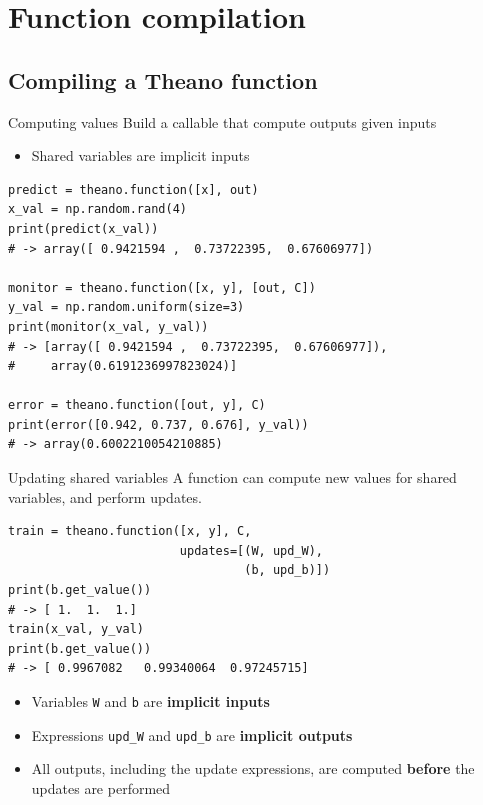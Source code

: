 \documentclass[a4paper,9pt]{beamer}
\begin{document}
\section{Function compilation}
\begin{frame}
  \tableofcontents[currentsection]
\end{frame}

\subsection{Compiling a Theano function}

\begin{frame}[fragile]{Computing values}
  Build a callable that compute outputs given inputs
  \begin{itemize}
    \item Shared variables are implicit inputs
  \end{itemize}
  \begin{verbatim}
predict = theano.function([x], out)
x_val = np.random.rand(4)
print(predict(x_val))
# -> array([ 0.9421594 ,  0.73722395,  0.67606977])

monitor = theano.function([x, y], [out, C])
y_val = np.random.uniform(size=3)
print(monitor(x_val, y_val))
# -> [array([ 0.9421594 ,  0.73722395,  0.67606977]),
#     array(0.6191236997823024)]

error = theano.function([out, y], C)
print(error([0.942, 0.737, 0.676], y_val))
# -> array(0.6002210054210885)
  \end{verbatim}
\end{frame}


\begin{frame}[fragile]{Updating shared variables}
  A function can compute new values for shared variables, and perform updates.
  \begin{verbatim}
train = theano.function([x, y], C,
                        updates=[(W, upd_W),
                                 (b, upd_b)])
print(b.get_value())
# -> [ 1.  1.  1.]
train(x_val, y_val)
print(b.get_value())
# -> [ 0.9967082   0.99340064  0.97245715]
  \end{verbatim}
  \begin{itemize}
    \item Variables \verb|W| and \verb|b| are {\bf implicit inputs}
    \item Expressions \verb|upd_W| and \verb|upd_b| are {\bf implicit outputs}
    \item All outputs, including the update expressions, are computed {\bf before} the updates are performed
  \end{itemize}
\end{frame}
\end{document}
